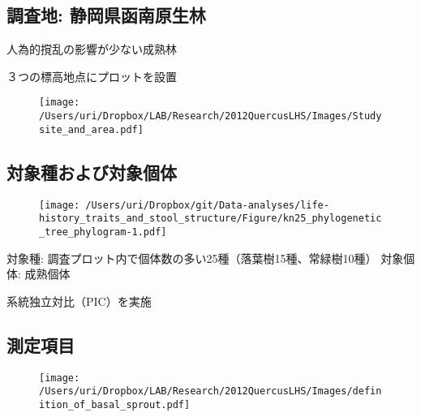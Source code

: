 \documentclass[a0, 36pt, plainboxedsections]{sciposter} %
\begin{document}
\begin{multicols}{3}\footnotesize{

\subsection*{\small{調査地: 静岡県函南原生林}}

人為的撹乱の影響が少ない成熟林

３つの標高地点にプロットを設置

\begin{figure}
  \texttt{[image: /Users/uri/Dropbox/LAB/Research/2012QuercusLHS/Images/Studysite\_and\_area.pdf]}
\end{figure}

\columnbreak
\subsection*{\small{対象種および対象個体}}

\vspace{-3em}
\begin{wrapfigure}{r}{12em}
  \texttt{[image: /Users/uri/Dropbox/git/Data-analyses/life-history\_traits\_and\_stool\_structure/Figure/kn25\_phylogenetic\_tree\_phylogram-1.pdf]}
\end{wrapfigure}

対象種: 調査プロット内で個体数の多い25種（落葉樹15種、常緑樹10種）
対象個体: 成熟個体

系統独立対比（PIC）を実施

\columnbreak
\subsection*{\small{測定項目}}

\begin{figure}
  \texttt{[image: /Users/uri/Dropbox/LAB/Research/2012QuercusLHS/Images/definition\_of\_basal\_sprout.pdf]}
\end{figure}

}\end{multicols}


\end{document}
